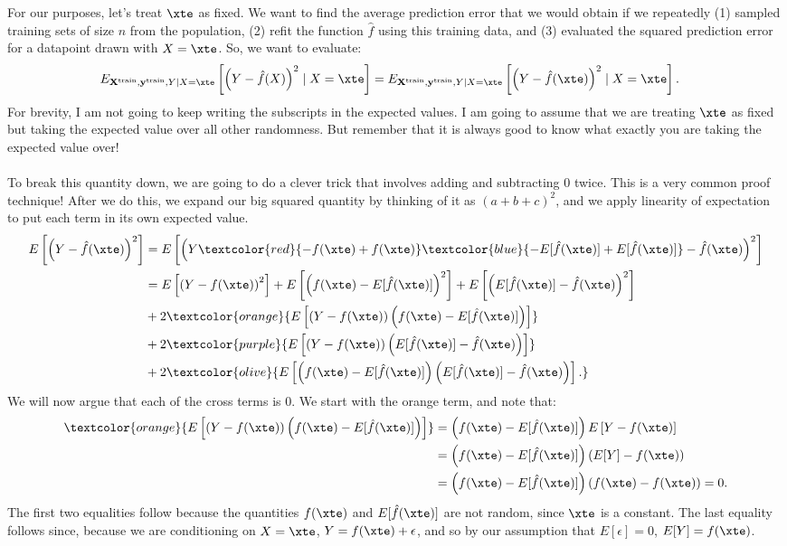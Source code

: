 For our purposes, let's treat $\xte$ as fixed. We want to find the average prediction error that we would obtain if we repeatedly (1) sampled training sets of size $n$ from the population, (2) refit the function $\hat{f}$ using this training data, and (3) evaluated the squared prediction error for a datapoint drawn with $X = \xte$. So, we want to evaluate: 
\begin{align*}
	E_{\bold{X}^\mathrm{train}, \bold{y}^\mathrm{train},Y \mid X=\xte}\left[\left(Y - \hat{f}(X)\right)^2 \mid X=\xte \right] &= 	E_{\bold{X}^\mathrm{train}, \bold{y}^\mathrm{train},Y \mid X=\xte}\left[\left(Y - \hat{f}(\xte)\right)^2 \mid X=\xte \right]. 
\end{align*}
For brevity, I am not going to keep writing the subscripts in the expected values. I am going to assume that we are treating $\xte$ as fixed but taking the expected value over all other randomness. But remember that it is always good to know what exactly you are taking the expected value over! \\
\\
To break this quantity down, we are going to do a clever trick that involves adding and subtracting $0$ twice. This is a very common proof technique! After we do this, we expand our big squared quantity by thinking of it as $(a+b+c)^2$, and we apply linearity of expectation to put each term in its own expected value.  
\begin{align*}
  E\left[\left(Y - \hat{f}(\xte)\right)^2 \right] &=   E\left[\left(Y  \textcolor{red}{-f(\xte) + f(\xte)} \textcolor{blue}{-E[\hat{f}(\xte)] + E[\hat{f}(\xte)]} -  \hat{f}(\xte)\right)^2 \right]  \\
  &= E\left[\left(Y -f(\xte)\right)^2\right] + E\left[\left(f(\xte) - E[\hat{f}(\xte)]\right)^2\right] + E\left[\left(E[\hat{f}(\xte)] -  \hat{f}(\xte)\right)^2\right] \\
  & + 2 \textcolor{orange}{E\left[\left(Y -f(\xte)\right) \left(f(\xte) - E[\hat{f}(\xte)]\right)\right]}\\
  & + 2 \textcolor{purple}{E\left[\left(Y -f(\xte)\right) \left(E[\hat{f}(\xte)] -  \hat{f}(\xte)\right)\right]} \\
  & + 2  \textcolor{olive}{E\left[\left(f(\xte) - E[\hat{f}(\xte)]\right) \left(E[\hat{f}(\xte)] -  \hat{f}(\xte)\right)\right].  }
\end{align*}
We will now argue that each of the cross terms is $0$. We start with the orange term, and note that: 
\begin{align*}
\textcolor{orange}{E\left[\left(Y -f(\xte)\right) \left(f(\xte) - E[\hat{f}(\xte)]\right)\right]} &= \left(f(\xte) - E[\hat{f}(\xte)]\right) E\left[ Y -f(\xte)\right]\\
&= \left(f(\xte) - E[\hat{f}(\xte)]\right) \left( E[Y] -f(\xte)\right)\\
&= 	\left(f(\xte) - E[\hat{f}(\xte)]\right) \left(f(\xte) -f(\xte)\right) = 0. 
\end{align*}
The first two equalities follow because the quantities $f(\xte)$ and $E[\hat{f}(\xte)]$ are not random, since $\xte$ is a constant. The last equality follows since, because we are conditioning on $X = \xte$, $Y = f(\xte) + \epsilon$, and so by our assumption that $E[\epsilon]=0$, $E[Y] =f(\xte)$. 

